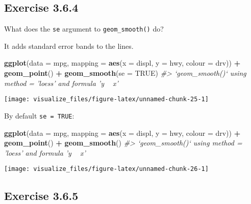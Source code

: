 \documentclass[]{book}
\newenvironment{Shaded}{\begin{snugshade}}{\end{snugshade}}
\newcommand{\CommentTok}[1]{\textcolor[rgb]{0.56,0.35,0.01}{\textit{#1}}}
\newcommand{\DataTypeTok}[1]{\textcolor[rgb]{0.13,0.29,0.53}{#1}}
\newcommand{\KeywordTok}[1]{\textcolor[rgb]{0.13,0.29,0.53}{\textbf{#1}}}
\newcommand{\NormalTok}[1]{#1}
\newcommand{\OperatorTok}[1]{\textcolor[rgb]{0.81,0.36,0.00}{\textbf{#1}}}
\newcommand{\OtherTok}[1]{\textcolor[rgb]{0.56,0.35,0.01}{#1}}
\newcommand{\StringTok}[1]{\textcolor[rgb]{0.31,0.60,0.02}{#1}}
\theoremstyle{plain}
\theoremstyle{remark}
\begin{document}
\hypertarget{exercise-3.6.4}{%
\subsection*{\texorpdfstring{Exercise
{3.6.4}}{Exercise 3.6.4}}\label{exercise-3.6.4}}

What does the \texttt{se} argument to \texttt{geom\_smooth()} do?

It adds standard error bands to the lines.

\begin{Shaded}
\begin{Highlighting}[]
\KeywordTok{ggplot}\NormalTok{(}\DataTypeTok{data =}\NormalTok{ mpg, }\DataTypeTok{mapping =} \KeywordTok{aes}\NormalTok{(}\DataTypeTok{x =}\NormalTok{ displ, }\DataTypeTok{y =}\NormalTok{ hwy, }\DataTypeTok{colour =}\NormalTok{ drv)) }\OperatorTok{+}
\StringTok{  }\KeywordTok{geom_point}\NormalTok{() }\OperatorTok{+}
\StringTok{  }\KeywordTok{geom_smooth}\NormalTok{(}\DataTypeTok{se =} \OtherTok{TRUE}\NormalTok{)}
\CommentTok{#> `geom_smooth()` using method = 'loess' and formula 'y ~ x'}
\end{Highlighting}
\end{Shaded}

\begin{center}\texttt{[image: visualize\_files/figure-latex/unnamed-chunk-25-1]} \end{center}

By default \texttt{se\ =\ TRUE}:

\begin{Shaded}
\begin{Highlighting}[]
\KeywordTok{ggplot}\NormalTok{(}\DataTypeTok{data =}\NormalTok{ mpg, }\DataTypeTok{mapping =} \KeywordTok{aes}\NormalTok{(}\DataTypeTok{x =}\NormalTok{ displ, }\DataTypeTok{y =}\NormalTok{ hwy, }\DataTypeTok{colour =}\NormalTok{ drv)) }\OperatorTok{+}
\StringTok{  }\KeywordTok{geom_point}\NormalTok{() }\OperatorTok{+}
\StringTok{  }\KeywordTok{geom_smooth}\NormalTok{()}
\CommentTok{#> `geom_smooth()` using method = 'loess' and formula 'y ~ x'}
\end{Highlighting}
\end{Shaded}

\begin{center}\texttt{[image: visualize\_files/figure-latex/unnamed-chunk-26-1]} \end{center}

\hypertarget{exercise-3.6.5}{%
\subsection*{\texorpdfstring{Exercise
{3.6.5}}{Exercise 3.6.5}}\label{exercise-3.6.5}}
\end{document}
